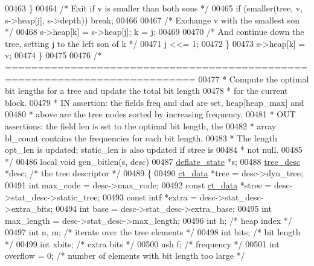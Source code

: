 \begin{DoxyCode}
{{{{{{{{{00463         \}
00464         \textcolor{comment}{/* Exit if v is smaller than both sons */}
00465         \textcolor{keywordflow}{if} (smaller(tree, v, s->heap[j], s->depth)) \textcolor{keywordflow}{break};
00466 
00467         \textcolor{comment}{/* Exchange v with the smallest son */}
00468         s->heap[k] = s->heap[j];  k = j;
00469 
00470         \textcolor{comment}{/* And continue down the tree, setting j to the left son of k */}
00471         j <<= 1;
00472     \}
00473     s->heap[k] = v;
00474 \}
00475 
00476 \textcolor{comment}{/* ===========================================================================}
00477 \textcolor{comment}{ * Compute the optimal bit lengths for a tree and update the total bit length}
00478 \textcolor{comment}{ * for the current block.}
00479 \textcolor{comment}{ * IN assertion: the fields freq and dad are set, heap[heap\_max] and}
00480 \textcolor{comment}{ *    above are the tree nodes sorted by increasing frequency.}
00481 \textcolor{comment}{ * OUT assertions: the field len is set to the optimal bit length, the}
00482 \textcolor{comment}{ *     array bl\_count contains the frequencies for each bit length.}
00483 \textcolor{comment}{ *     The length opt\_len is updated; static\_len is also updated if stree is}
00484 \textcolor{comment}{ *     not null.}
00485 \textcolor{comment}{ */}
00486 local \textcolor{keywordtype}{void} gen\_bitlen(s, desc)
00487     \hyperlink{structinternal__state}{deflate\_state} *s;
00488     \hyperlink{structtree__desc__s}{tree\_desc} *desc;    \textcolor{comment}{/* the tree descriptor */}
00489 \{
00490     \hyperlink{structct__data__s}{ct\_data} *tree        = desc->dyn\_tree;
00491     \textcolor{keywordtype}{int} max\_code         = desc->max\_code;
00492     \textcolor{keyword}{const} \hyperlink{structct__data__s}{ct\_data} *stree = desc->stat\_desc->static\_tree;
00493     \textcolor{keyword}{const} intf *extra    = desc->stat\_desc->extra\_bits;
00494     \textcolor{keywordtype}{int} base             = desc->stat\_desc->extra\_base;
00495     \textcolor{keywordtype}{int} max\_length       = desc->stat\_desc->max\_length;
00496     \textcolor{keywordtype}{int} h;              \textcolor{comment}{/* heap index */}
00497     \textcolor{keywordtype}{int} n, m;           \textcolor{comment}{/* iterate over the tree elements */}
00498     \textcolor{keywordtype}{int} bits;           \textcolor{comment}{/* bit length */}
00499     \textcolor{keywordtype}{int} xbits;          \textcolor{comment}{/* extra bits */}
00500     ush f;              \textcolor{comment}{/* frequency */}
00501     \textcolor{keywordtype}{int} overflow = 0;   \textcolor{comment}{/* number of elements with bit length too large */}
}}}}}}}}}
\end{DoxyCode}
